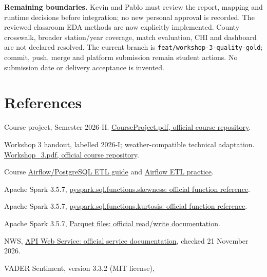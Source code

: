 \documentclass[10pt]{article}
\begin{document}
\textbf{Remaining boundaries.} Kevin and Pablo must review the report, mapping
and runtime decisions before integration; no new personal approval is recorded.
The reviewed classroom EDA methods are now explicitly implemented. County
crosswalk, broader station/year coverage, match evaluation,
CHI and dashboard are not declared resolved. The current branch is
\texttt{feat/workshop-3-quality-gold}; commit, push, merge and platform submission
remain student actions. No submission date or delivery acceptance is invented.

\section*{References}
{\small
\begin{enumerate}[label={[\arabic*]}]
\item Course project, Semester 2026-II.
\href{https://github.com/EngAndres/ud-public/blob/main/courses/data-analysis-programming/project/CourseProject.pdf}{CourseProject.pdf, official course repository}.
\item Workshop 3 handout, labelled 2026-I; weather-compatible technical adaptation.
\href{https://github.com/EngAndres/ud-public/blob/main/courses/data-analysis-programming/project/Workshop_3.pdf}{Workshop\_3.pdf, official course repository}.
\item Course \href{https://github.com/EngAndres/ud-public/blob/main/courses/data-analysis-programming/guides/Airflow-PostgreSQL-ETL.pdf}{Airflow/PostgreSQL ETL guide} and
\href{https://github.com/EngAndres/ud-public/tree/main/courses/data-analysis-programming/practices/airflow_etl}{Airflow ETL practice}.
\item Apache Spark 3.5.7,
\href{https://spark.apache.org/docs/3.5.7/api/python/reference/pyspark.sql/api/pyspark.sql.functions.skewness.html}{pyspark.sql.functions.skewness: official function reference}.
\item Apache Spark 3.5.7,
\href{https://spark.apache.org/docs/3.5.7/api/python/reference/pyspark.sql/api/pyspark.sql.functions.kurtosis.html}{pyspark.sql.functions.kurtosis: official function reference}.
\item Apache Spark 3.5.7,
\href{https://spark.apache.org/docs/3.5.7/sql-data-sources-parquet.html}{Parquet files: official read/write documentation}.
\item NWS,
\href{https://www.weather.gov/documentation/services-web-api}{API Web Service: official service documentation}, checked 21 November 2026.
\item VADER Sentiment, version 3.3.2 (MIT license),

\end{enumerate}}
\end{document}
